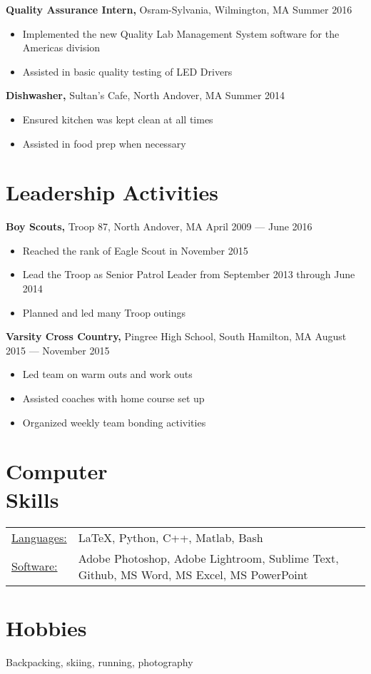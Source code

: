 \documentclass[margin]{res}
\begin{document}
\begin{resume}
	{\bf Quality Assurance Intern,} Osram-Sylvania, Wilmington, MA \hfill Summer 2016
	\begin{itemize} \itemsep -2pt
		\item Implemented the new Quality Lab Management System software for the Americas division
		\item Assisted in basic quality testing of LED Drivers
	\end{itemize}

	{\bf Dishwasher,} Sultan's Cafe, North Andover, MA \hfill Summer 2014
	\begin{itemize} \itemsep -2pt
		\item Ensured kitchen was kept clean at all times
		\item Assisted in food prep when necessary
	\end{itemize}

	\section{Leadership Activities}
	{\bf Boy Scouts,} Troop 87, North Andover, MA \hfill April 2009 --- June 2016
	\begin{itemize} \itemsep -2pt
		\item Reached the rank of Eagle Scout in November 2015
		\item Lead the Troop as Senior Patrol Leader from September 2013 through June 2014
		\item Planned and led many Troop outings
	\end{itemize}
	{\bf Varsity Cross Country,} Pingree High School, South Hamilton, MA \hfill August 2015 --- November 2015
	\begin{itemize} \itemsep -2pt
		\item Led team on warm outs and work outs
		\item Assisted coaches with home course set up
		\item Organized weekly team bonding activities
	\end{itemize}

	\section{Computer \\ Skills}
	\begin{tabular}{l p{3.7in}}
		\underline{Languages:} & \LaTeX, Python, C++, Matlab, Bash \tabularnewline

		\underline{Software:} & Adobe Photoshop, Adobe Lightroom, Sublime Text, Github, MS Word, MS Excel, MS PowerPoint
	\end{tabular}

	\section{Hobbies}
	Backpacking, skiing, running, photography

\end{resume}
\end{document}

